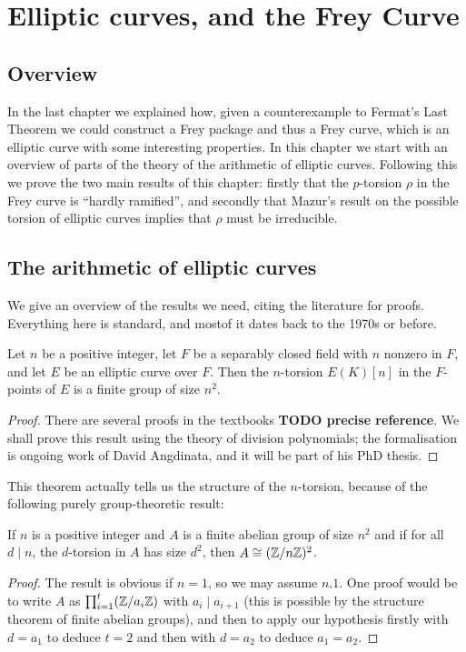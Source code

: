 \chapter{Elliptic curves, and the Frey Curve}

\section{Overview}

In the last chapter we explained how, given a counterexample to Fermat's Last Theorem we could construct a Frey package and thus a Frey curve, which is an elliptic curve with some interesting properties. In this chapter we start with an overview of parts of the theory of the arithmetic of elliptic curves. Following
this we prove the two main results of this chapter: firstly that the $p$-torsion $\rho$ in the Frey curve is ``hardly ramified'', and secondly that Mazur's result on the possible torsion of elliptic curves implies that $\rho$ must be irreducible.

\section{The arithmetic of elliptic curves}

We give an overview of the results we need, citing the literature for proofs. Everything here is
 standard, and mostof it dates back to the 1970s or before.

\begin{theorem}\label{Elliptic_curve_n_torsion_size}\tangled{}
  Let $n$ be a positive integer, let $F$ be a separably closed
  field with $n$ nonzero in $F$, and let $E$ be an elliptic curve over $F$. Then the $n$-torsion $E(K)[n]$ 
  in the $F$-points of $E$ is a finite group of size $n^2$.
\end{theorem}
\begin{proof}
  There are several proofs in the textbooks {\bf TODO precise reference}. We shall prove this result using the theory of division polynomials; the formalisation is ongoing work of David Angdinata, and it will be part of his PhD thesis.
\end{proof}

This theorem actually tells us the structure of the $n$-torsion, because of the following
purely group-theoretic result:
\begin{lemma}\label{group_theory_lemma}
  If $n$ is a positive integer and $A$ is a finite
  abelian group of size $n^2$ and if for all $d\mid n$, the $d$-torsion in $A$ has size $d^2$, 
  then $A\cong (\mathbb{Z}/n\mathbb{Z})^2$. 
\end{lemma}
\begin{proof}
  The result is obvious if $n=1$, so we may assume $n.1$. One proof would be to write $A$ as $\prod_{i=1}^t(\mathbb{Z}/a_i\mathbb{Z})$
  with $a_i\mid a_{i+1}$ (this is possible by the structure theorem of finite abelian groups), and then to apply our hypothesis firstly with $d=a_1$ to deduce $t=2$ and then with $d=a_2$ to deduce $a_1=a_2$.
\end{proof}

